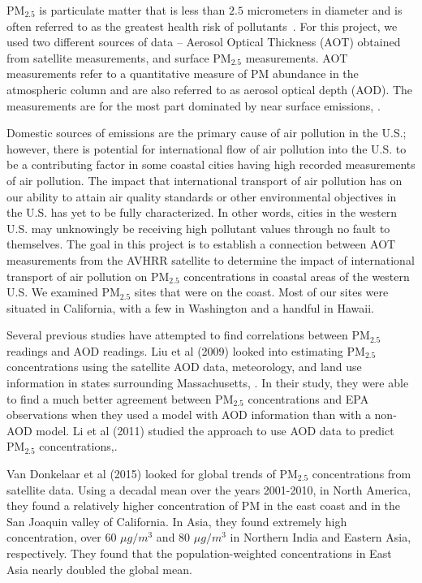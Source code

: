 \documentclass[10pt]{article}
\begin{document}
PM$_{2.5}$ is particulate matter that is less than $2.5$ micrometers in diameter and is often referred to as the greatest health risk of pollutants~\cite{epa}. For this project, we used two different sources of data -- Aerosol Optical Thickness (AOT) obtained from satellite measurements, and surface PM$_{2.5}$ measurements. AOT measurements refer to a quantitative measure of PM abundance in the atmospheric column and are also referred to as aerosol optical depth (AOD). %
The measurements are for the most part dominated by near surface emissions, \cite{liu}. 

Domestic sources of emissions are the primary cause of air pollution in the U.S.; however, there is potential for international flow of air pollution into the U.S. to be a contributing factor in some coastal cities having high recorded measurements of air pollution. The impact that international transport of air pollution has on our ability to attain air quality standards or other environmental objectives in the U.S. has yet to be fully characterized. In other words, cities in the western U.S. may unknowingly be receiving high pollutant values through no fault to themselves. The goal in this project is to establish a connection between AOT measurements from the AVHRR satellite to determine the impact of international transport of air pollution on PM$_{2.5}$ concentrations in coastal areas of the western U.S. We examined PM$_{2.5}$ sites that were on the coast. Most of our sites were situated in California, with a few in Washington and a handful in Hawaii. %


Several previous studies have attempted to find correlations between PM$_{2.5}$ readings and AOD readings. 
Liu et al (2009) looked into estimating PM$_{2.5}$ concentrations using the satellite AOD data, meteorology, and land use information in states surrounding Massachusetts, \cite{Liu}. In their study, they were able to find a much better agreement between PM$_{2.5}$ concentrations and EPA observations when they used a model with AOD information than with a non-AOD model. %
Li et al (2011) studied the approach to use AOD data to predict PM$_{2.5}$ concentrations,\cite{lee}.

Van Donkelaar et al (2015) looked for global trends of PM$_{2.5}$ concentrations from satellite data. Using a decadal mean over the years 2001-2010, in North America, they found a relatively higher concentration of PM in the east coast and in the San Joaquin valley of California. In Asia, they found extremely high concentration, over 60 $\mu g/m^3$ and 80 $\mu g/m^3$ in Northern India and Eastern Asia, respectively. They found that the population-weighted concentrations in East Asia nearly doubled the global mean.
\end{document}
